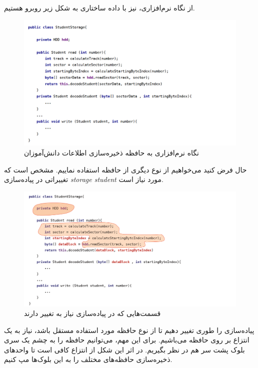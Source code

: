 \begin{flushright}
    از نگاه نرم‌افزاری، نیز با داده ساختاری به شکل زیر روبرو هستیم.

    \begin{figure}[H]
        \centering
        \includegraphics[scale=0.41]{source/student-storage-model-1}
        \caption{نگاه نرم‌افزاری به حافظه ذخیره‌سازی اطلاعات دانش‌آموزان}
        \label{fig:student-storage-model-1}
    \end{figure}

    حال فرض کنید می‌خواهیم از نوع دیگری از حافظه استفاده نماییم.
    مشخص است که تغییراتی در پیاده‌سازی \emph{storage student} مورد نیاز است.

    \begin{figure}[H]
        \centering
        \includegraphics[scale=0.41]{source/student-storage-model-1-hardcoded}
        \caption{قسمت‌هایی که در پیاده‌سازی نیاز به تغییر دارند}
        \label{fig:student-storage-model-1-hardcoded}
    \end{figure}


    پیاده‌سازی را طوری تغییر دهیم تا از نوع حافظه مورد استفاده مستقل باشد، نیاز به یک انتزاع بر روی حافظه می‌باشیم.
    برای این مهم، می‌توانیم حافظه را به چشم یک سری بلوک پشت سر هم در نظر بگیریم.
    در اثر این شکل از انتزاع کافی است تا واحد‌های ذخیره‌سازی حافظه‌های مختلف را به این بلوک‌ها مپ کنیم.


\end{flushright}
